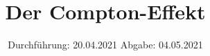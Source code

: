 

\subject{V603}
\title{Der Compton-Effekt}
\date{%
  Durchführung: 20.04.2021
  \hspace{3em}
  Abgabe: 04.05.2021
}



\maketitle
\thispagestyle{empty}
\tableofcontents
\newpage







\printbibliography{}


